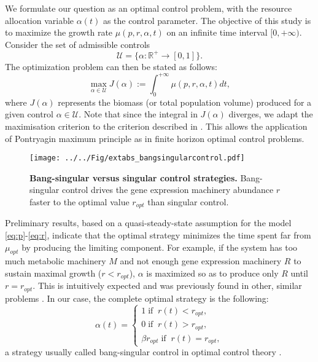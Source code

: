 \documentclass[a4paper, 10pt, conference]{ieeeconf}      %
\begin{document}
We formulate our question as an optimal control problem, with the resource allocation variable $\alpha(t)$ as the control parameter.
The objective of this study is to maximize the growth rate $\mu(p,r, \alpha, t)$ on an infinite time interval $[0, +\infty)$.
Consider the set of admissible controls
\[
\mathcal{U}=\{\alpha:\mathbb{R}^+ \rightarrow [0,1] \}.
\]
The optimization problem can then be stated as follows:
\begin{equation}\label{Prob}
\max_{\alpha \in \mathcal{U}} J(\alpha):=\int_0^{+\infty} \mu(p, r, \alpha, t) dt,
\end{equation}
where $J(\alpha)$ represents the biomass (or total population volume) produced for a given control $\alpha\in \mathcal{U}$.
Note that since the integral in $J(\alpha)$ diverges, we adapt the maximisation criterion to the criterion described in \cite{halkin_necessary_1974}. This allows the application of Pontryagin maximum principle as in finite horizon optimal control problems.

\begin{figure*}[htbp]
\centering
\texttt{[image: ../../Fig/extabs\_bangsingularcontrol.pdf]}
\caption{\textbf{Bang-singular versus singular control strategies.}
Bang-singular control drives the gene expression machinery abundance $r$ faster to the optimal value $r_{opt}$ than singular control.
}
\label{fig::simul}
\end{figure*}

\addtolength{\textheight}{-5.6cm}   %


Preliminary results, based on a quasi-steady-state assumption for the model \eqref{eq:p}-\eqref{eq:r}, indicate that the optimal strategy minimizes the time spent far from $\mu_{opt}$ by producing the limiting component.
For example, if the system has too much metabolic machinery $M$ and not enough gene expression machinery $R$ to sustain maximal growth ($r < r_{opt}$), $\alpha$ is maximized so as to produce only $R$ until $r = r_{opt}$.
This is intuitively expected and was previously found in other, similar problems \cite{pavlov_optimal_2013,berg_optimal_1998, berg_optimal_2002}. In our case, the complete optimal strategy is the following:
\begin{equation}
\alpha(t) = 
\begin{cases}
1 \; \text{if} \;\; r(t)<r_{opt},\\
0 \; \text{if} \;\; r(t)>r_{opt},\\
\beta r_{opt} \; \text{if} \;\; r(t)=r_{opt},
\end{cases}
\label{optstrat}
\end{equation}
a strategy usually called bang-singular control in optimal control theory \cite{bryson_applied_1975}. 
\end{document}
